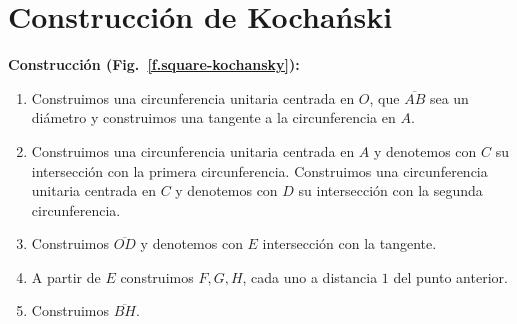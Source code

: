 
\section{Construcción de Kocha\'{n}ski}\label{s.square-kochanski}
\textbf{Construcción (Fig.~\ref{f.square-kochansky}):}
\begin{enumerate}
\item Construimos una circunferencia unitaria centrada en $O$, que $\overline{AB}$ sea un diámetro y construimos una tangente a la circunferencia en $A$.
\item Construimos una circunferencia unitaria centrada en $A$ y denotemos con $C$ su intersección con la primera circunferencia. Construimos una circunferencia unitaria centrada en $C$ y denotemos con $D$ su intersección con la segunda circunferencia. 
\item Construimos $\overline{OD}$ y denotemos con $E$ intersección con la tangente.
\item A partir de $E$ construimos $F,G,H$, cada uno a distancia $1$ del punto anterior.
\item Construimos $\overline{BH}$.
\end{enumerate}

